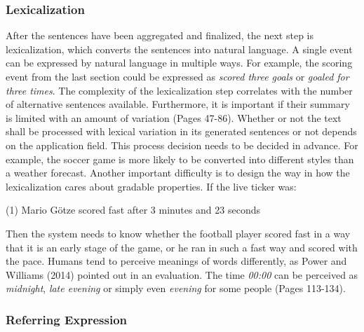 \subsubsection{Lexicalization}\label{ss:lex}

After the sentences have been aggregated and finalized, the next step is lexicalization, which converts the sentences into natural language. A single event can be expressed by natural language in multiple ways. For example, the scoring event from the last section could be expressed as \textit{scored three goals} or \textit{goaled for three times}. The complexity of the lexicalization step correlates with the number of alternative sentences available. Furthermore, it is important if their summary is limited with an amount of variation \cite{Theune} (Pages 47-86). Whether or not the text shall be processed with lexical variation in its generated sentences or not depends on the application field. This process decision needs to be decided in advance. For example, the soccer game is more likely to be converted into different styles than a weather forecast. Another important difficulty is to design the way in how the lexicalization cares about gradable properties. If the live ticker was:

\begin{tcolorbox}
	\begin{center}
		(1) Mario Götze scored fast after 3 minutes and 23 seconds
	\end{center}
\end{tcolorbox}

Then the system needs to know whether the football player scored fast in a way that it is an early stage of the game, or he ran in such a fast way and scored with the pace. Humans tend to perceive meanings of words differently, as Power and Williams (2014) pointed out in an evaluation. The time \textit{00:00} can be perceived as \textit{midnight}, \textit{late evening} or simply even \textit{evening} for some people \cite{Power} (Pages 113-134).


\subsubsection{Referring Expression}\label{ss:ref}

